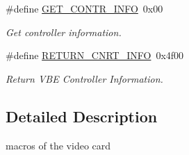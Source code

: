 \begin{DoxyCompactItemize}
\mbox{\label{group__videocard__macros_ga05adf2154c245b06f3d851890ec1faaf}} 
\#define \hyperlink{group__videocard__macros_ga05adf2154c245b06f3d851890ec1faaf}{G\+E\+T\+\_\+\+C\+O\+N\+T\+R\+\_\+\+I\+N\+FO}~0x00
\begin{DoxyCompactList}\small\item\em Get controller information. \end{DoxyCompactList}\item 
\mbox{\label{group__videocard__macros_gae116498f272730823fb2a04e0556408a}} 
\#define \hyperlink{group__videocard__macros_gae116498f272730823fb2a04e0556408a}{R\+E\+T\+U\+R\+N\+\_\+\+C\+N\+R\+T\+\_\+\+I\+N\+FO}~0x4f00
\begin{DoxyCompactList}\small\item\em Return V\+BE Controller Information. \end{DoxyCompactList}\end{DoxyCompactItemize}


\subsection{Detailed Description}
macros of the video card 